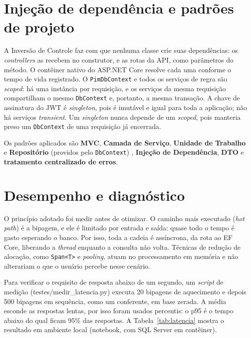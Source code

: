 \section{Injeção de dependência e padrões de projeto}

A Inversão de Controle faz com que nenhuma classe crie suas dependências: os \textit{controllers} as recebem no construtor, e as rotas da API, como parâmetros do método. O contêiner nativo do ASP.NET Core resolve cada uma conforme o tempo de vida registrado. O \texttt{PimDbContext} e todos os serviços de regra são \textit{scoped}: há uma instância por requisição, e os serviços da mesma requisição compartilham o mesmo \texttt{DbContext} e, portanto, a mesma transação. A chave de assinatura do JWT é \textit{singleton}, pois é imutável e igual para toda a aplicação; não há serviços \textit{transient}. Um \textit{singleton} nunca depende de um \textit{scoped}, pois manteria preso um \texttt{DbContext} de uma requisição já encerrada.

Os padrões aplicados são \textbf{MVC}, \textbf{Camada de Serviço}, \textbf{Unidade de Trabalho} e \textbf{Repositório} (providos pelo \texttt{DbContext}) \cite{fowler2006}, \textbf{Injeção de Dependência}, \textbf{DTO} e \textbf{tratamento centralizado de erros}.

\section{Desempenho e diagnóstico}
\label{sec:desempenho}

O princípio adotado foi medir antes de otimizar. O caminho mais executado (\textit{hot path}) é a bipagem, e ele é limitado por entrada e saída: quase todo o tempo é gasto esperando o banco. Por isso, toda a cadeia é assíncrona, da rota ao EF Core, liberando a \textit{thread} enquanto a consulta não volta. Técnicas de redução de alocação, como \texttt{Span<T>} e \textit{pooling}, atuam no processamento em memória e não alterariam o que o usuário percebe nesse cenário.

Para verificar o requisito de resposta abaixo de um segundo, um \textit{script} de medição (testes/\allowbreak medir\_latencia.py) executa 20 bipagens de aquecimento e depois 500 bipagens em sequência, como um conferente, em base zerada. A média esconde as respostas lentas, por isso foram usados percentis: o p95 é o tempo abaixo do qual ficam 95\% das respostas. A Tabela~\ref{tab:latencia} mostra o resultado em ambiente local (notebook, com SQL Server em contêiner).

